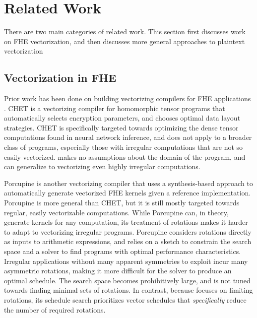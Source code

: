 \section{Related Work}\label{sec:related-work}
There are two main categories of related work. This section first discusses work on FHE vectorization, and then discusses more general approaches to plaintext vectorization 

\subsection{Vectorization in FHE}
Prior work has been done on building vectorizing compilers for FHE applications \cite{CHET, Porcupine}.
CHET \cite{CHET} is a vectorizing compiler for homomorphic tensor programs that automatically selects encryption parameters, and chooses optimal data layout strategies.
CHET is specifically targeted towards optimizing the dense tensor computations found in neural network inference, and does not apply to a broader class of programs, especially those with irregular computations that are not so easily vectorized.
\system makes no assumptions about the domain of the program, and can generalize to vectorizing even highly irregular computations.

Porcupine \cite{Porcupine} is another vectorizing compiler that uses a synthesis-based approach to automatically generate vectorized FHE kernels given a reference implementation.
Porcupine is more general than CHET, but it is still mostly targeted towards regular, easily vectorizable computations.
While Porcupine can, in theory, generate kernels for any computation, its treatment of rotations makes it harder to adapt to vectorizing irregular programs.
Porcupine considers rotations directly as inputs to arithmetic expressions, and relies on a sketch to constrain the search space and a solver to find programs with optimal performance characteristics.
Irregular applications without many apparent symmetries to exploit incur many asymmetric rotations, making it more difficult for the solver to produce an optimal schedule. The search space becomes prohibitively large, and is not tuned towards finding minimal sets of rotations.
In contrast, because \system focuses on limiting rotations, its schedule search prioritizes vector schedules that {\em specifically} reduce the number of required rotations. 

